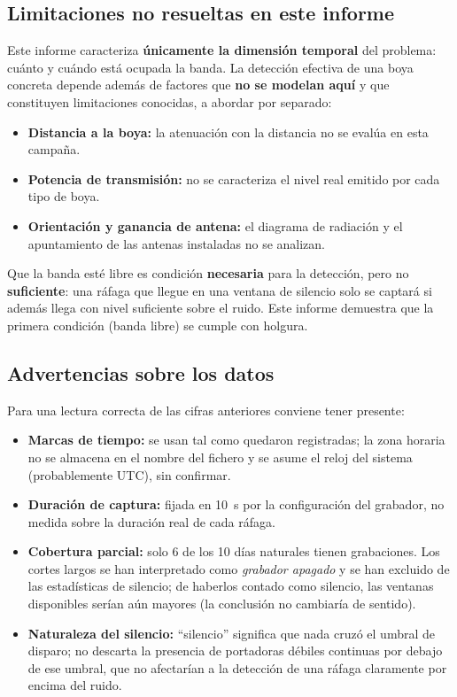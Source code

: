 \subsection{Limitaciones no resueltas en este informe}

Este informe caracteriza \textbf{únicamente la dimensión temporal} del problema: cuánto y cuándo está ocupada la banda. La detección efectiva de una boya concreta depende además de factores que \textbf{no se modelan aquí} y que constituyen limitaciones conocidas, a abordar por separado:

\begin{itemize}
    \item \textbf{Distancia a la boya:} la atenuación con la distancia no se evalúa en esta campaña.
    \item \textbf{Potencia de transmisión:} no se caracteriza el nivel real emitido por cada tipo de boya.
    \item \textbf{Orientación y ganancia de antena:} el diagrama de radiación y el apuntamiento de las antenas instaladas no se analizan.
\end{itemize}

Que la banda esté libre es condición \textbf{necesaria} para la detección, pero no \textbf{suficiente}: una ráfaga que llegue en una ventana de silencio solo se captará si además llega con nivel suficiente sobre el ruido. Este informe demuestra que la primera condición (banda libre) se cumple con holgura.

\subsection{Advertencias sobre los datos}

Para una lectura correcta de las cifras anteriores conviene tener presente:

\begin{itemize}
    \item \textbf{Marcas de tiempo:} se usan tal como quedaron registradas; la zona horaria no se almacena en el nombre del fichero y se asume el reloj del sistema (probablemente UTC), sin confirmar.
    \item \textbf{Duración de captura:} fijada en \SI{10}{\second} por la configuración del grabador, no medida sobre la duración real de cada ráfaga.
    \item \textbf{Cobertura parcial:} solo 6 de los 10 días naturales tienen grabaciones. Los cortes largos se han interpretado como \textit{grabador apagado} y se han excluido de las estadísticas de silencio; de haberlos contado como silencio, las ventanas disponibles serían aún mayores (la conclusión no cambiaría de sentido).
    \item \textbf{Naturaleza del silencio:} ``silencio'' significa que nada cruzó el umbral de disparo; no descarta la presencia de portadoras débiles continuas por debajo de ese umbral, que no afectarían a la detección de una ráfaga claramente por encima del ruido.
\end{itemize}

